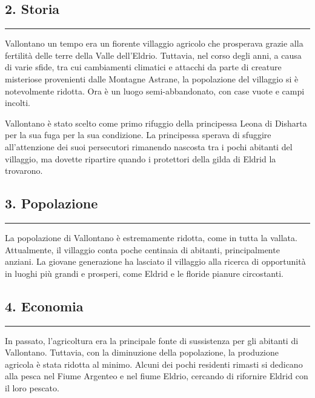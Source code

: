 \subsection{2. Storia}\label{storia}

\begin{center}\rule{0.5\linewidth}{0.5pt}\end{center}

Vallontano un tempo era un fiorente villaggio agricolo che prosperava
grazie alla fertilità delle terre della Valle dell'Eldrio. Tuttavia, nel
corso degli anni, a causa di varie sfide, tra cui cambiamenti climatici
e attacchi da parte di creature misteriose provenienti dalle Montagne
Astrane, la popolazione del villaggio si è notevolmente ridotta. Ora è
un luogo semi-abbandonato, con case vuote e campi incolti.

Vallontano è stato scelto come primo rifuggio della principessa Leona di
Disharta per la sua fuga per la sua condizione. La principessa sperava
di sfuggire all'attenzione dei suoi persecutori rimanendo nascosta tra i
pochi abitanti del villaggio, ma dovette ripartire quando i protettori
della gilda di Eldrid la trovarono.

\subsection{3. Popolazione}\label{popolazione}

\begin{center}\rule{0.5\linewidth}{0.5pt}\end{center}

La popolazione di Vallontano è estremamente ridotta, come in tutta la
vallata. Attualmente, il villaggio conta poche centinaia di abitanti,
principalmente anziani. La giovane generazione ha lasciato il villaggio
alla ricerca di opportunità in luoghi più grandi e prosperi, come Eldrid
e le floride pianure circostanti.

\subsection{4. Economia}\label{economia}

\begin{center}\rule{0.5\linewidth}{0.5pt}\end{center}

In passato, l'agricoltura era la principale fonte di sussistenza per gli
abitanti di Vallontano. Tuttavia, con la diminuzione della popolazione,
la produzione agricola è stata ridotta al minimo. Alcuni dei pochi
residenti rimasti si dedicano alla pesca nel Fiume Argenteo e nel fiume
Eldrio, cercando di rifornire Eldrid con il loro pescato.

